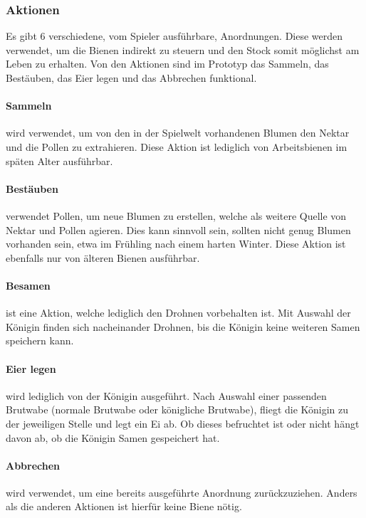 \subsubsection{Aktionen}
Es gibt 6 verschiedene, vom Spieler ausführbare, Anordnungen. Diese werden verwendet, um die Bienen indirekt zu steuern und den Stock somit möglichst am Leben zu erhalten. Von den Aktionen sind im Prototyp das Sammeln, das Bestäuben, das Eier legen und das Abbrechen funktional. 

\paragraph{Sammeln} wird verwendet, um von den in der Spielwelt vorhandenen Blumen den Nektar und die Pollen zu extrahieren. Diese Aktion ist lediglich von Arbeitsbienen im späten Alter ausführbar.

\paragraph{Bestäuben} verwendet Pollen, um neue Blumen zu erstellen, welche als weitere Quelle von Nektar und Pollen agieren. Dies kann sinnvoll sein, sollten nicht genug Blumen vorhanden sein, etwa im Frühling nach einem harten Winter. Diese Aktion ist ebenfalls nur von älteren Bienen ausführbar.

\paragraph{Besamen} ist eine Aktion, welche lediglich den Drohnen vorbehalten ist. Mit Auswahl der Königin finden sich nacheinander Drohnen, bis die Königin keine weiteren Samen speichern kann.

\paragraph{Eier legen} wird lediglich von der Königin ausgeführt. Nach Auswahl einer passenden Brutwabe (normale Brutwabe oder königliche Brutwabe), fliegt die Königin zu der jeweiligen Stelle und legt ein Ei ab. Ob dieses befruchtet ist oder nicht hängt davon ab, ob die Königin Samen gespeichert hat.

\paragraph{Abbrechen} wird verwendet, um eine bereits ausgeführte Anordnung zurückzuziehen. Anders als die anderen Aktionen ist hierfür keine Biene nötig.

